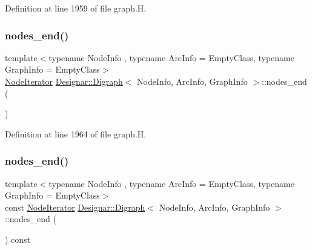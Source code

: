 Definition at line 1959 of file graph.\+H.

\mbox{\label{class_designar_1_1_digraph_a67917506d721e541955aa2a639b94759}} 
\subsubsection{\texorpdfstring{nodes\+\_\+end()}{nodes\_end()}\hspace{0.1cm}{\footnotesize\ttfamily [1/2]}}
{\footnotesize\ttfamily template$<$typename Node\+Info , typename Arc\+Info  = Empty\+Class, typename Graph\+Info  = Empty\+Class$>$ \\
\hyperlink{class_designar_1_1_digraph_1_1_node_iterator}{Node\+Iterator} \hyperlink{class_designar_1_1_digraph}{Designar\+::\+Digraph}$<$ Node\+Info, Arc\+Info, Graph\+Info $>$\+::nodes\+\_\+end (\begin{DoxyParamCaption}{ }\end{DoxyParamCaption})\hspace{0.3cm}{\ttfamily [inline]}}



Definition at line 1964 of file graph.\+H.

\mbox{\label{class_designar_1_1_digraph_a82c01284de2fc81c7bd04c13d8861d9a}} 
\subsubsection{\texorpdfstring{nodes\+\_\+end()}{nodes\_end()}\hspace{0.1cm}{\footnotesize\ttfamily [2/2]}}
{\footnotesize\ttfamily template$<$typename Node\+Info , typename Arc\+Info  = Empty\+Class, typename Graph\+Info  = Empty\+Class$>$ \\
const \hyperlink{class_designar_1_1_digraph_1_1_node_iterator}{Node\+Iterator} \hyperlink{class_designar_1_1_digraph}{Designar\+::\+Digraph}$<$ Node\+Info, Arc\+Info, Graph\+Info $>$\+::nodes\+\_\+end (\begin{DoxyParamCaption}{ }\end{DoxyParamCaption}) const\hspace{0.3cm}{\ttfamily [inline]}}



